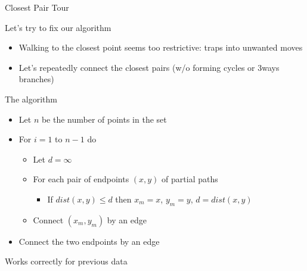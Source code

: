 \begin{frame}{Closest Pair Tour}
  \begin{block}{Let's try to fix our algorithm}
    \begin{itemize}
    \item Walking to the closest point seems too restrictive: 
      {\small traps into unwanted moves}
    \item Let's repeatedly connect the closest pairs 
      {\small(w/o forming cycles or 3ways branches)}
    \end{itemize}
  \end{block}\vspace{-.8\baselineskip}

  \begin{block}{The algorithm}
    \begin{itemize}
    \item Let $n$ be the number of points in the set 
    \item For $i=1$ to $n-1$ do
      \begin{itemize}
      \item Let $d=\infty$
      \item For each pair of endpoints $(x,y)$ of partial paths
        \begin{itemize}
        \item If $dist(x,y)\leq d$ then $x_m=x$, $y_m=y$, $d=dist(x,y)$
        \end{itemize}
      \item Connect $(x_m,y_m)$ by an edge
      \end{itemize}
    \item Connect the two endpoints by an edge
    \end{itemize}
  \end{block}\vspace{-.7\baselineskip}

  \begin{block}{Works correctly for previous data}\medskip
    \begin{center}
      \only<3| handout:0>{\texttt{[image: fig/proof\_salesman3.fig]}}%
      
    \end{center}    
  \end{block}
\end{frame}
